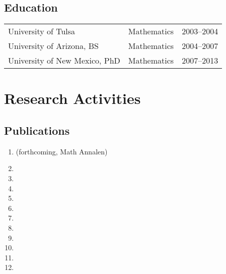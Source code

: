 \documentclass[a4paper,10pt]{article}
\begin{document}
 \subsection*{Education}
 \begin{flushleft}
\begin{tabular}{p{2in} p{1in}p{1in}}
University of Tulsa & Mathematics & 2003--2004 \\
University of Arizona, BS & Mathematics & 2004--2007\\
University of New Mexico, PhD &  Mathematics & 2007--2013
 \end{tabular}
 \end{flushleft}

\iffalse 
\subsection*{Research Interests}
Broad:  Algebraic Geometry, Differential Algebra, Number Theory, Applied Model Theory  \\
Specific: Deformation Theory, Diophantine Geometry, Differential Algebra and Witt vectors.
\fi 

\section*{Research Activities}

\subsection*{Publications}
\begin{enumerate}
	\item {} (forthcoming, Math Annalen)
	\item  {} 
	\item  {}
	\item {}
	\item {}
	\item {}
	\item {}
	\item {}
	\item {}
	\item {}
	\item {}
	\item {}
\end{enumerate}
\end{document}
